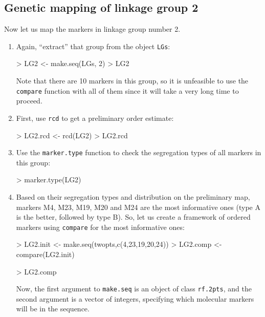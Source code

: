 \documentclass[letterpaper,12pt,oneside]{article}
\begin{document}
\subsection{Genetic mapping of linkage group 2}
\label{group2outcrossing}
 Now let us map the markers in linkage group number 2.
 
\begin{enumerate}
\item Again, ``extract'' that group from the object {\tt LGs}:
\begin{Schunk}
\begin{Sinput}
> LG2 <- make.seq(LGs, 2)
> LG2
\end{Sinput}
\end{Schunk}
Note that there are 10 markers in this group, so it is unfeasible to use the {\tt compare} function with all of them since it will take a very long time to proceed.

\item First, use {\tt rcd} to get a preliminary order estimate:
\begin{Schunk}
\begin{Sinput}
> LG2.rcd <- rcd(LG2)
> LG2.rcd
\end{Sinput}
\end{Schunk}

\item Use the {\tt marker.type} function to check the segregation types of all markers in this group:
\begin{Schunk}
\begin{Sinput}
> marker.type(LG2)
\end{Sinput}
\end{Schunk}

\item Based on their segregation types and distribution on the preliminary map, markers M4, M23, M19, M20 and M24 are the most informative ones (type A is the better, followed by type B). So, let us create a framework of ordered markers using {\tt compare} for the most informative ones: 
\begin{Schunk}
\begin{Sinput}
> LG2.init <- make.seq(twopts,c(4,23,19,20,24))
> LG2.comp <- compare(LG2.init)
\end{Sinput}
\end{Schunk}
\begin{Schunk}
\begin{Sinput}
> LG2.comp
\end{Sinput}
\end{Schunk}
Now, the first argument to {\tt make.seq} is an object of class {\tt rf.2pts}, and the second argument is a vector of integers, specifying which molecular markers will be in the sequence.


\end{enumerate}
\end{document}
